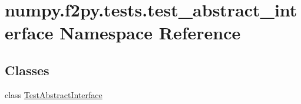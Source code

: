 \hypertarget{namespacenumpy_1_1f2py_1_1tests_1_1test__abstract__interface}{}\section{numpy.\+f2py.\+tests.\+test\+\_\+abstract\+\_\+interface Namespace Reference}
\label{namespacenumpy_1_1f2py_1_1tests_1_1test__abstract__interface}
\subsection*{Classes}
\begin{DoxyCompactItemize}
\item 
class \hyperlink{classnumpy_1_1f2py_1_1tests_1_1test__abstract__interface_1_1TestAbstractInterface}{Test\+Abstract\+Interface}
\end{DoxyCompactItemize}
